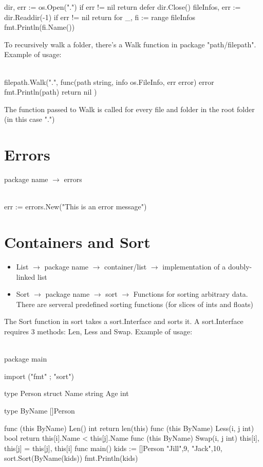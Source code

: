 \documentclass[twoside,a4paper,english]{report}
\begin{document}
\begin{go}
dir, err := os.Open(".")
if err != nil {
    return 
}
defer dir.Close()
fileInfos, err := dir.Readdir(-1)
if err != nil {
    return 
}
for _, fi := range fileInfos {
       fmt.Println(fi.Name())
}
\end{go}
To recursively walk a folder, there's a Walk function in package "path/filepath". Example of usage:\\\\
\begin{go}
filepath.Walk(".", func(path string, info os.FileInfo, err error) error {
    fmt.Println(path)
    return nil 
})
\end{go}
The function passed to Walk is called for every file and folder in the root folder (in this case ".")   
\section{Errors}
package name $\rightarrow$ errors\\\\
\begin{go}
err := errors.New("This is an error message")
\end{go}   
\section{Containers and Sort}
\begin{itemize}
\item List $\rightarrow$ package name $\rightarrow$ container/list $\rightarrow$ implementation of a doubly-linked list
\item Sort $\rightarrow$ package name $\rightarrow$ sort $\rightarrow$ Functions for sorting arbitrary data. There are serveral predefined sorting functions (for slices of ints and floats)
\end{itemize}
The Sort function in sort takes a sort.Interface and sorts it. A sort.Interface requires 3 methods: Len, Less and Swap. Example of usage:\\\\
\begin{go}
package main

import ("fmt" ; "sort")

type Person struct {
    Name string
    Age int 
}

type ByName []Person

func (this ByName) Len() int {
    return len(this)
}
func (this ByName) Less(i, j int) bool {
    return this[i].Name < this[j].Name
}
func (this ByName) Swap(i, j int) {
    this[i], this[j] = this[j], this[i]
}
func main() {
     kids := []Person{
            {"Jill",9},
            {"Jack",10},
     }
     sort.Sort(ByName(kids))
     fmt.Println(kids)
}
\end{go}
\end{document}
